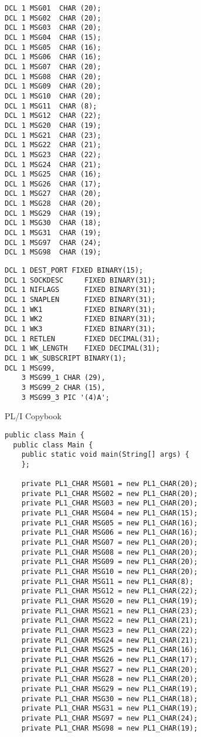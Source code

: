 \begin{figure}[H]
\begin{lstlisting}[language=PL/I, escapeinside=``]
DCL 1 MSG01  CHAR (20);
DCL 1 MSG02  CHAR (20);
DCL 1 MSG03  CHAR (20);
DCL 1 MSG04  CHAR (15);
DCL 1 MSG05  CHAR (16);
DCL 1 MSG06  CHAR (16);
DCL 1 MSG07  CHAR (20);
DCL 1 MSG08  CHAR (20);
DCL 1 MSG09  CHAR (20);
DCL 1 MSG10  CHAR (20);
DCL 1 MSG11  CHAR (8);
DCL 1 MSG12  CHAR (22);
DCL 1 MSG20  CHAR (19);
DCL 1 MSG21  CHAR (23);
DCL 1 MSG22  CHAR (21);
DCL 1 MSG23  CHAR (22);
DCL 1 MSG24  CHAR (21);
DCL 1 MSG25  CHAR (16);
DCL 1 MSG26  CHAR (17);
DCL 1 MSG27  CHAR (20);
DCL 1 MSG28  CHAR (20);
DCL 1 MSG29  CHAR (19);
DCL 1 MSG30  CHAR (18);
DCL 1 MSG31  CHAR (19);
DCL 1 MSG97  CHAR (24);
DCL 1 MSG98  CHAR (19);
\end{lstlisting}
\end{figure}

\begin{figure}[H]
\begin{lstlisting}[language=PL/I, escapeinside=``, firstnumber=27]
DCL 1 DEST_PORT FIXED BINARY(15);
DCL 1 SOCKDESC     FIXED BINARY(31);
DCL 1 NIFLAGS      FIXED BINARY(31);
DCL 1 SNAPLEN      FIXED BINARY(31);
DCL 1 WK1          FIXED BINARY(31);
DCL 1 WK2          FIXED BINARY(31);
DCL 1 WK3          FIXED BINARY(31);
DCL 1 RETLEN       FIXED DECIMAL(31);
DCL 1 WK_LENGTH    FIXED DECIMAL(31);
DCL 1 WK_SUBSCRIPT BINARY(1);
DCL 1 MSG99,
    3 MSG99_1 CHAR (29),
    3 MSG99_2 CHAR (15),
    3 MSG99_3 PIC '(4)A';
\end{lstlisting}
\caption{PL/I Copybook}
\end{figure}

\begin{figure}[H]
\begin{lstlisting}[language=PL/I, escapeinside=``]
public class Main {
  public class Main {
	public static void main(String[] args) {
	};

	private PL1_CHAR MSG01 = new PL1_CHAR(20);
	private PL1_CHAR MSG02 = new PL1_CHAR(20);
	private PL1_CHAR MSG03 = new PL1_CHAR(20);
	private PL1_CHAR MSG04 = new PL1_CHAR(15);
	private PL1_CHAR MSG05 = new PL1_CHAR(16);
	private PL1_CHAR MSG06 = new PL1_CHAR(16);
	private PL1_CHAR MSG07 = new PL1_CHAR(20);
	private PL1_CHAR MSG08 = new PL1_CHAR(20);
	private PL1_CHAR MSG09 = new PL1_CHAR(20);
	private PL1_CHAR MSG10 = new PL1_CHAR(20);
	private PL1_CHAR MSG11 = new PL1_CHAR(8);
	private PL1_CHAR MSG12 = new PL1_CHAR(22);
	private PL1_CHAR MSG20 = new PL1_CHAR(19);
	private PL1_CHAR MSG21 = new PL1_CHAR(23);
	private PL1_CHAR MSG22 = new PL1_CHAR(21);
	private PL1_CHAR MSG23 = new PL1_CHAR(22);
	private PL1_CHAR MSG24 = new PL1_CHAR(21);
	private PL1_CHAR MSG25 = new PL1_CHAR(16);
	private PL1_CHAR MSG26 = new PL1_CHAR(17);
	private PL1_CHAR MSG27 = new PL1_CHAR(20);
	private PL1_CHAR MSG28 = new PL1_CHAR(20);
	private PL1_CHAR MSG29 = new PL1_CHAR(19);
	private PL1_CHAR MSG30 = new PL1_CHAR(18);
	private PL1_CHAR MSG31 = new PL1_CHAR(19);
	private PL1_CHAR MSG97 = new PL1_CHAR(24);
	private PL1_CHAR MSG98 = new PL1_CHAR(19);
\end{lstlisting}
\end{figure}

